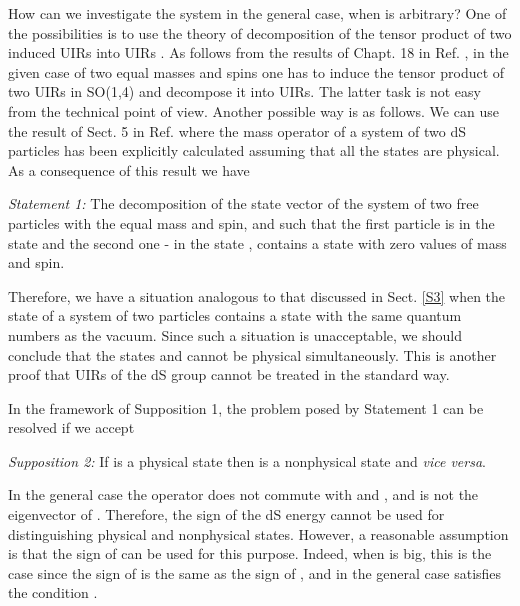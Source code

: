 \documentclass[a4paper,12pt]{article}%
\begin{document}
How can we investigate the system in the general
case, when \coordHE{} is arbitrary? One of the possibilities
is to use the theory of decomposition of the tensor
product of two induced UIRs into UIRs 
\cite{Naimark,Klimyk2,Barut}. As follows from the
results of Chapt. 18 in Ref. \cite{Barut}, in the 
given case of two equal masses and spins one has
to induce the tensor product of two UIRs 
\coordHE{} in SO(1,4) and decompose it
into UIRs. The latter task is not easy from the
technical point of view. Another possible way is
as follows. We can use the result of Sect. 5 in 
Ref. \cite{lev1} where the mass operator of a system
of two dS particles has been explicitly calculated
assuming that all the states are physical.
As a consequence of this result we have 

{\it Statement 1:} The decomposition of the state 
vector of the system of two free particles with the 
equal mass and spin, and 
such that the first particle is in the state 
\coordHE{} and the second one - in the state 
\coordHE{}, contains a state
with zero values of mass and spin.    

Therefore, we have a 
situation analogous to that discussed in Sect.
\ref{S3} when the state of a system of two 
particles contains a state with the 
same quantum numbers as the vacuum. Since such a
situation is unacceptable, we should conclude that
the states \coordHE{} and 
\coordHE{} cannot be
physical simultaneously. This is another proof
that UIRs of the dS group cannot be treated in the
standard way.

In the framework of Supposition 1, the problem
posed by Statement 1 can be resolved if we accept

{\it Supposition 2:} If \coordHE{} is 
a physical state then \coordHE{}
is a nonphysical state and {\it vice versa}. 

In the general case the operator \coordHE{} does not
commute with \coordHE{} and \coordHE{}, and \coordHE{} 
is not the eigenvector of \coordHE{}.  
Therefore, the sign of the dS energy cannot be used 
for distinguishing physical 
and nonphysical states. However, a reasonable 
assumption is that the sign of \coordHE{} can be
used for this purpose. Indeed, when \coordHE{} is big,
this is the case since the sign of \coordHE{} is
the same as the sign of \coordHE{}, and in the general
case \coordHE{} satisfies the condition
\coordHE{}. 
\end{document}
